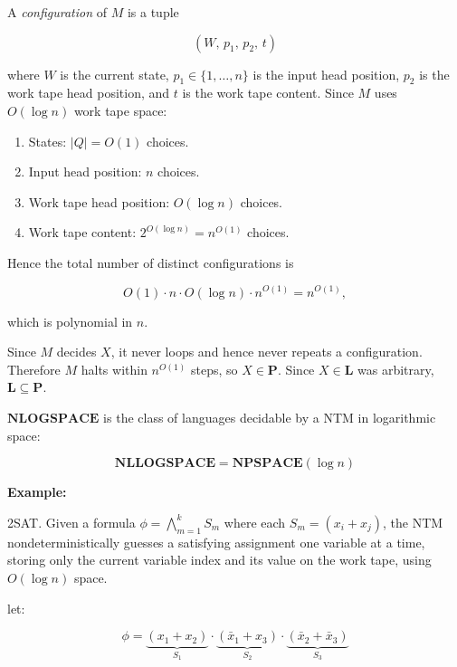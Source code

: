 \documentclass[12pt,a4paper,openany]{article}
\begin{document}
A \emph{configuration} of $M$ is a tuple

\[
(W,\, p_1,\, p_2,\, t)
\]

where $W$ is the current state, $p_1 \in \{1,\ldots,n\}$ is the input head position, $p_2$ is the work tape head position, and $t$ is the work tape content. Since $M$ uses $O(\log n)$ work tape space:

\begin{enumerate}
    \item States: $|Q| = O(1)$ choices.
    \item Input head position: $n$ choices.
    \item Work tape head position: $O(\log n)$ choices.
    \item Work tape content: $2^{O(\log n)} = n^{O(1)}$ choices.
\end{enumerate}

Hence the total number of distinct configurations is

\[
O(1) \cdot n \cdot O(\log n) \cdot n^{O(1)} = n^{O(1)},
\]

which is polynomial in $n$.

Since $M$ decides $X$, it never loops and hence never repeats a configuration. 
Therefore $M$ halts within $n^{O(1)}$ steps, so $X \in \mathbf{P}$. Since $X \in \mathbf{L}$ was arbitrary, $\mathbf{L} \subseteq \mathbf{P}$.

$\mathbf{NLOGSPACE}$ is the class of languages decidable by a NTM in logarithmic space:

\begin{equation*}
\mathbf{NLLOGSPACE} = \mathbf{NPSPACE}(\log n)
\end{equation*} 

\textbf{Example:} 

2SAT. Given a formula $\phi = \displaystyle\bigwedge_{m=1}^{k} S_m$ where each
$S_m = (x_i + x_j)$, the NTM nondeterministically guesses a satisfying assignment one variable
at a time, storing only the current variable index and its value on the work tape, using $O(\log n)$ space.

let:

\[
\phi = \underbrace{(x_1 + x_2)}_{S_1} \cdot \underbrace{(\bar{x}_1 + x_3)}_{S_2} \cdot \underbrace{(\bar{x}_2 + \bar{x}_3)}_{S_3}
\]
\end{document}
